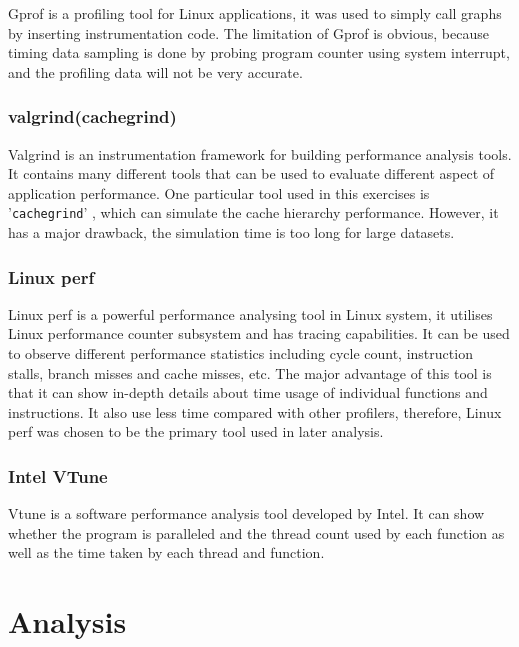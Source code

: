 \documentclass[conference]{IEEEtran}
\begin{document}
Gprof is a profiling tool for Linux applications, it was used to simply call graphs by inserting instrumentation code. The limitation of Gprof is obvious, because timing data sampling is done by probing program counter using system interrupt, and the profiling data will not be very accurate.
\cite{graham1982gprof}

\subsubsection{valgrind(cachegrind)}

Valgrind \cite{nethercote2003valgrind} is an instrumentation framework for building performance analysis tools. It contains many different tools that can be used to evaluate different aspect of application performance. One particular tool used in this exercises is '\texttt{cachegrind}' \cite{seward2004cachegrind}, which can simulate the cache hierarchy performance. However, it has a major drawback, the simulation time is too long for large datasets.

\subsubsection{Linux perf}

Linux perf \cite{de2010new} is a powerful performance analysing tool in Linux system, it utilises Linux performance counter subsystem and has tracing capabilities. It can be used to observe different performance statistics including cycle count, instruction stalls, branch misses and cache misses, etc. The major advantage of this tool is that it can show in-depth details about time usage of individual functions and instructions. It also use less time compared with other profilers, therefore, Linux perf was chosen to be the primary tool used in later analysis.

\subsubsection{Intel VTune}

Vtune \cite{malladi2009using} is a software performance analysis tool developed by Intel. It can show whether the program is paralleled and the thread count used by each function as well as the time taken by each thread and function.  

\section{Analysis}
\end{document}
